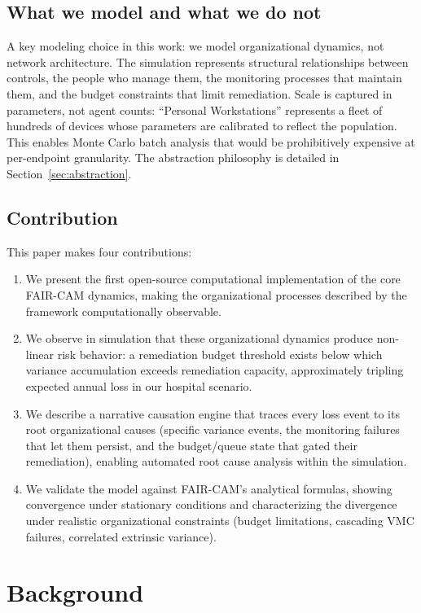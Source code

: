 \documentclass[11pt,a4paper]{article}
\begin{document}
\subsection{What we model and what we do not}

A key modeling choice in this work: we model organizational dynamics, not network architecture. The simulation represents structural relationships between controls, the people who manage them, the monitoring processes that maintain them, and the budget constraints that limit remediation. Scale is captured in parameters, not agent counts: ``Personal Workstations'' represents a fleet of hundreds of devices whose parameters are calibrated to reflect the population. This enables Monte Carlo batch analysis that would be prohibitively expensive at per-endpoint granularity. The abstraction philosophy is detailed in Section~\ref{sec:abstraction}.

\subsection{Contribution}

This paper makes four contributions:
\begin{enumerate}[nosep]
    \item We present the first open-source computational implementation of the core FAIR-CAM dynamics, making the organizational processes described by the framework computationally observable.
    \item We observe in simulation that these organizational dynamics produce non-linear risk behavior: a remediation budget threshold exists below which variance accumulation exceeds remediation capacity, approximately tripling expected annual loss in our hospital scenario.
    \item We describe a narrative causation engine that traces every loss event to its root organizational causes (specific variance events, the monitoring failures that let them persist, and the budget/queue state that gated their remediation), enabling automated root cause analysis within the simulation.
    \item We validate the model against FAIR-CAM's analytical formulas, showing convergence under stationary conditions and characterizing the divergence under realistic organizational constraints (budget limitations, cascading VMC failures, correlated extrinsic variance).
\end{enumerate}


\section{Background}
\end{document}
